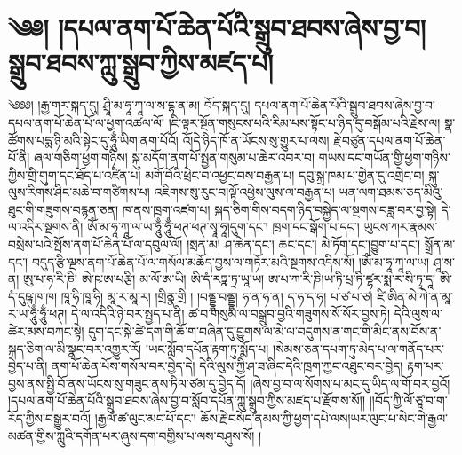 \setcounter{footnote}{0} 
\chapter{༄༅། །དཔལ་ནག་པོ་ཆེན་པོའི་སྒྲུབ་ཐབས་ཞེས་བྱ་བ། སྒྲུབ་ཐབས་ཀླུ་སྒྲུབ་ཀྱིས་མཛད་པ།}༄༅༅། །རྒྱ་གར་སྐད་དུ། ཤྲཱི་མ་ཧཱ་ཀཱ་ལ་ས་དྷ་ན་མ། བོད་སྐད་དུ། དཔལ་ནག་པོ་ཆེན་པོའི་སྒྲུབ་ཐབས་ཞེས་བྱ་བ། དཔལ་ནག་པོ་ཆེན་པོ་ལ་ཕྱག་འཚལ་ལོ། །ཇི་ལྟར་སྔོན་གསུངས་པའི་རིམ་པས་སྟོང་པ་ཉིད་དུ་བསྒོམ་པའི་རྗེས་ལ། སྣ་ཚོགས་པདྨ་ཉི་མའི་སྟེང་དུ་ཧཱུྃ་ཡིག་ནག་པོའོ། འོ།དེ་ཉིད་ཁོ་ན་ཡོངས་སུ་གྱུར་པ་ལས། རྗེ་བཙུན་དཔལ་ནག་པོ་ཆེན་པོ་ནི། ཞལ་གཅིག་ཕྱག་གཉིས། སྐུ་མདོག་ནག་པོ་སྤྱན་གསུམ་པ་ཆེར་འབར་བ། གཡས་དང་གཡོན་གྱི་ཕྱག་གཉིས་ཀྱིས་གྲི་གུག་དང་ཐོད་པ་འཛིན་པ། མགོ་བོའི་ཕྲེང་བ་འཕྱང་བས་བརྒྱན་པ། དབུ་སྐྲ་ཁམ་པ་གྱེན་དུ་འགྲེང་བ། སྐུ་ལུས་རིགས་ཤིང་མཆེ་བ་གཙིགས་པ། འཇིགས་སུ་རུང་བ།ལྟོ་འཕྱེས་ལུས་ལ་བརྒྱན་པ། ཡན་ལག་ཐམས་ཅད་མིའུ་ཐུང་གི་གཟུགས་བརྙན་ཅན། ཁ་ནས་ཁྲག་འཛག་པ། སྐད་ཅིག་གིས་བདག་ཉིད་བསྐྱེད་ལ་སྔགས་བཟླ་བར་བྱ་སྟེ། དེ་ལ་འདིར་སྔགས་ནི། ཨོཾ་མ་ཧཱ་ཀཱ་ལ་ཡ་ཧཱུྃ་ཧཱུྃ་ཕཊ་ཕཊ་སྭཱ་ཧཱ།དུག་དང་། ཁྲག་དང་སྒོག་པ་དང་། ཡུངས་ཀར་རྣམས་བསྲེས་པའི་སྤོས་ནག་པོ་ཆེན་པོ་ལ་དབུལ་ལོ། །སྲན་མ། ཤ་ཆེན་དང་། ཆང་དང་། མེ་ཏོག་དང་།བྱུག་པ་དང་། སྒྲོན་མ་དང་། བདུད་རྩི་ལྔས་ནག་པོ་ཆེན་པོ་ལ་གསོལ་མཆོད་བྱས་ལ་གཏོར་མའི་སྔགས་འདིས་སོ། །ཨོཾ་མ་ཧཱ་ཀཱ་ལ་ཡ། ཤཱ་ས་ན། ཨུ་པ་ཧ་རི་ཎི། ཨེ་ཥ་ཨ་པརྩི། མ་ལོ་ཨ་ཡི། ཨི་དཾ་རཏྣ་ཏྲ་ཡཱ་ཡ། ཨ་པ་ཀ་རི་ཎི།ཡ་ཏི་པྲ་ཏི་ཛྷར་སྨ་ར་སི་ཏཱ་དཱ། ཨི་དཾ་དུཥྚ་ཁ་ཁ། ཁཱ་ཧི་ཁཱ་ཧི། མཱ་ར་མཱ་ར། །གྲིནྣ་གྲི ། །བནྡྷ་བནྡྷ། ཧ་ན་ཧ་ན། ད་ཧ་ད་ཧ། པ་ཙ་པ་ཙ། ཛི་ཨིན་མེ་ཀེ་ན་མཱ་ར་ཡ་ཧཱུྃ་ཧཱུྃ་ཕཊ། དེ་ལ་འདིའི་ཉེ་བར་སྤྱད་པ་ནི། ཚ་བ་གསུམ་ལ་བསྒྲུབ་བྱའི་གཟུགས་སོ་སོར་བྱས་ཏེ། དེའི་ལུས་ལ་ཚེར་མས་བཀང་སྟེ། དུག་དང་སྐེ་ཚེ་དག་གི་ཆོ་ག་བཞིན་དུ་བྱུགས་ལ་མེ་ལ་བདུགས་ན་གང་གི་མིང་ནས་བོས་ན་སྐད་ཅིག་ལ་མི་སྣང་བར་འགྱུར་རོ། །ཡང་སློབ་དཔོན་རྟག་ཏུ་སྨོད་པ། །སེམས་ཅན་དཔག་ཏུ་མེད་པ་ལ་གནོད་པར་བྱེད་པ་ནི། ནག་པོ་ཆེན་པོས་གསོལ་བར་བྱེད་དེ། དེའི་ལུས་ཀྱི་ཤ་ཟ་ཞིང་དེའི་ཁྲག་ཀྱང་འཐུང་བར་བྱེད། རྟག་པར་བྱས་ནས་སྤྱི་བོ་ནས་ཡོངས་སུ་གཟུང་ནས་ཏིལ་ཙམ་དུ་བྱེད་དོ། །ཞེས་བྱ་བ་ལ་སོགས་པ་མང་དུ་ཡིད་ལ་གོ་བར་བྱའོ། །དཔལ་ནག་པོ་ཆེན་པོའི་སྒྲུབ་ཐབས་ཞེས་བྱ་བ་སློབ་དཔོན་ཀླུ་སྒྲུབ་ཀྱིས་མཛད་པ་རྫོགས་སོ།། །།བོད་ཀྱི་ལོ་ཙཱ་བ་ག་རོད་ཀྱིས་བསྒྱུར་བའོ། །རྒྱལ་ཚ་ལུང་མང་པོ་དང་། ཆོས་རྗེ་བསོད་ནམས་ཀྱི་ཕྱག་དཔེ་ལས།ཡར་ལུང་པ་སེང་གེ་རྒྱལ་མཚན་གྱིས་ཀླུའི་དགོན་པར་ཞུས་དག་བགྱིས་པ་ལས་བཤུས་སོ། །